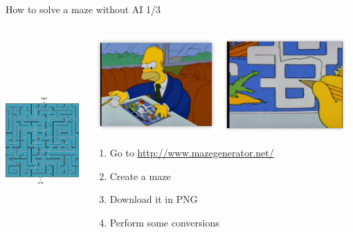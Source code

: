 \documentclass[
  ignorenonframetext,
  aspectratio=169,
]{beamer}
\providecommand{\tightlist}{%
  \setlength{\itemsep}{0pt}\setlength{\parskip}{0pt}}
\begin{document}
\begin{frame}{How to solve a maze without AI 1/3}
\protect\hypertarget{how-to-solve-a-maze-without-ai-13}{}
\renewcommand{\vec}{\mathbf}

\begin{columns}[T]
\begin{column}{0.5\textwidth}
\centering \includegraphics[width=\textwidth,height=8cm]{maze1.png}
\end{column}

\begin{column}{0.5\textwidth}
\includegraphics[width=0.48\textwidth,height=\textheight]{homer.png}
\includegraphics[width=0.48\textwidth,height=\textheight]{homer2.png}

\begin{enumerate}
\tightlist
\item
  Go to \url{http://www.mazegenerator.net/}
\item
  Create a maze
\item
  Download it in PNG
\item
  Perform some conversions


\end{enumerate}
\end{column}
\end{columns}
\end{frame}
\end{document}
